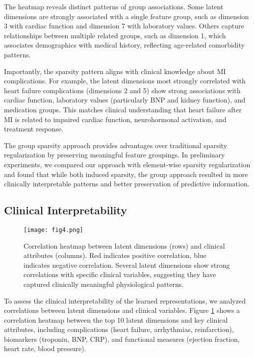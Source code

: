 \documentclass[oupdraft]{bio}
\begin{document}
The heatmap reveals distinct patterns of group associations. Some latent dimensions are strongly associated with a single feature group, such as dimension 3 with cardiac function and dimension 7 with laboratory values. Others capture relationships between multiple related groups, such as dimension 1, which associates demographics with medical history, reflecting age-related comorbidity patterns.

Importantly, the sparsity pattern aligns with clinical knowledge about MI complications. For example, the latent dimensions most strongly correlated with heart failure complications (dimensions 2 and 5) show strong associations with cardiac function, laboratory values (particularly BNP and kidney function), and medication groups. This matches clinical understanding that heart failure after MI is related to impaired cardiac function, neurohormonal activation, and treatment response.

The group sparsity approach provides advantages over traditional sparsity regularization by preserving meaningful feature groupings. In preliminary experiments, we compared our approach with element-wise sparsity regularization and found that while both induced sparsity, the group approach resulted in more clinically interpretable patterns and better preservation of predictive information.

\subsection{Clinical Interpretability}

\begin{figure}[t]
    \centering
    \texttt{[image: fig4.png]}
    \caption{Correlation heatmap between latent dimensions (rows) and clinical attributes (columns). Red indicates positive correlation, blue indicates negative correlation. Several latent dimensions show strong correlations with specific clinical variables, suggesting they have captured clinically meaningful physiological patterns.}
    \label{fig:correlation}
\end{figure}

To assess the clinical interpretability of the learned representations, we analyzed correlations between latent dimensions and clinical variables. Figure \ref{fig:correlation} shows a correlation heatmap between the top 10 latent dimensions and key clinical attributes, including complications (heart failure, arrhythmias, reinfarction), biomarkers (troponin, BNP, CRP), and functional measures (ejection fraction, heart rate, blood pressure).
\end{document}
